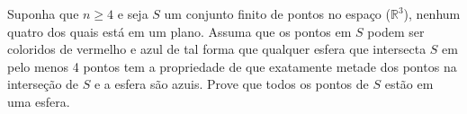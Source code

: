 Suponha que \(n \geq 4\) e seja \(S\) um conjunto finito de pontos no espaço (\(\mathbb{R}^3\)), nenhum quatro dos quais está em um plano. Assuma que os pontos em \(S\) podem ser coloridos de vermelho e azul de tal forma que qualquer esfera que intersecta \(S\) em pelo menos 4 pontos tem a propriedade de que exatamente metade dos pontos na interseção de \(S\) e a esfera são azuis. Prove que todos os pontos de \(S\) estão em uma esfera.
